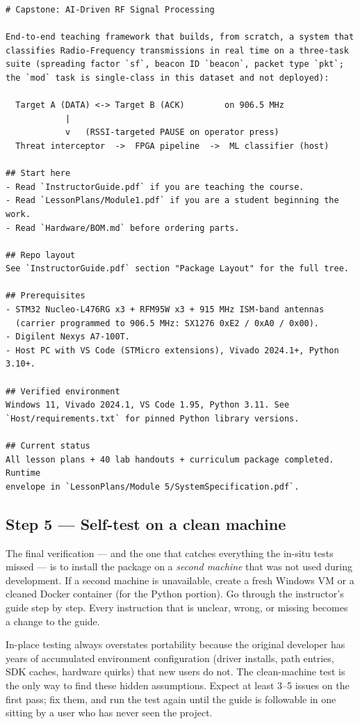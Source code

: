 \documentclass[11pt,letterpaper]{article}
\begin{document}
\begin{lstlisting}[caption={\texttt{README.md} --- first thing any new user sees. Keep it under one page printed.}]
# Capstone: AI-Driven RF Signal Processing

End-to-end teaching framework that builds, from scratch, a system that
classifies Radio-Frequency transmissions in real time on a three-task
suite (spreading factor `sf`, beacon ID `beacon`, packet type `pkt`;
the `mod` task is single-class in this dataset and not deployed):

  Target A (DATA) <-> Target B (ACK)        on 906.5 MHz
            |
            v   (RSSI-targeted PAUSE on operator press)
  Threat interceptor  ->  FPGA pipeline  ->  ML classifier (host)

## Start here
- Read `InstructorGuide.pdf` if you are teaching the course.
- Read `LessonPlans/Module1.pdf` if you are a student beginning the work.
- Read `Hardware/BOM.md` before ordering parts.

## Repo layout
See `InstructorGuide.pdf` section "Package Layout" for the full tree.

## Prerequisites
- STM32 Nucleo-L476RG x3 + RFM95W x3 + 915 MHz ISM-band antennas
  (carrier programmed to 906.5 MHz: SX1276 0xE2 / 0xA0 / 0x00).
- Digilent Nexys A7-100T.
- Host PC with VS Code (STMicro extensions), Vivado 2024.1+, Python 3.10+.

## Verified environment
Windows 11, Vivado 2024.1, VS Code 1.95, Python 3.11. See
`Host/requirements.txt` for pinned Python library versions.

## Current status
All lesson plans + 40 lab handouts + curriculum package completed. Runtime
envelope in `LessonPlans/Module 5/SystemSpecification.pdf`.
\end{lstlisting}

\subsection{Step 5 --- Self-test on a clean machine}
The final verification --- and the one that catches everything the in-situ tests missed --- is to install the package on a \emph{second machine} that was not used during development. If a second machine is unavailable, create a fresh Windows \mbox{VM} or a cleaned Docker container (for the Python portion). Go through the instructor's guide step by step. Every instruction that is unclear, wrong, or missing becomes a change to the guide.

\begin{tcolorbox}[infobox={Why a Clean-Machine Test Matters}]
	In-place testing always overstates portability because the original developer has years of accumulated environment configuration (driver installs, path entries, \mbox{SDK} caches, hardware quirks) that new users do not. The clean-machine test is the only way to find these hidden assumptions. Expect at least 3--5 issues on the first pass; fix them, and run the test again until the guide is followable in one sitting by a user who has never seen the project.
\end{tcolorbox}
\end{document}
